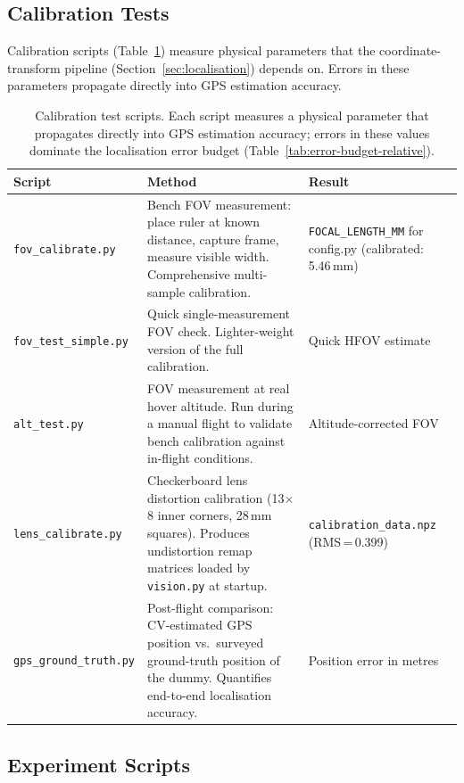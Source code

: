 \subsection{Calibration Tests}\label{sec:cal-tests}

Calibration scripts (Table~\ref{tab:cal-tests}) measure physical parameters that the coordinate-transform pipeline (Section~\ref{sec:localisation}) depends on.  Errors in these parameters propagate directly into GPS estimation accuracy.

\begin{table}[H]
\centering
\caption{Calibration test scripts.  Each script measures a physical parameter that propagates directly into GPS estimation accuracy; errors in these values dominate the localisation error budget (Table~\ref{tab:error-budget-relative}).}
\label{tab:cal-tests}
\small
\begin{tabular}{@{}lp{5.8cm}p{4.2cm}@{}}
\toprule
\textbf{Script} & \textbf{Method} & \textbf{Result} \\
\midrule
\texttt{fov\_calibrate.py} & Bench FOV measurement: place ruler at known distance, capture frame, measure visible width.  Comprehensive multi-sample calibration. & \texttt{FOCAL\_LENGTH\_MM} for config.py (calibrated: 5.46\,mm) \\
\addlinespace
\texttt{fov\_test\_simple.py} & Quick single-measurement FOV check.  Lighter-weight version of the full calibration. & Quick HFOV estimate \\
\addlinespace
\texttt{alt\_test.py} & FOV measurement at real hover altitude.  Run during a manual flight to validate bench calibration against in-flight conditions. & Altitude-corrected FOV \\
\addlinespace
\texttt{lens\_calibrate.py} & Checkerboard lens distortion calibration (13$\times$8 inner corners, 28\,mm squares).  Produces undistortion remap matrices loaded by \texttt{vision.py} at startup. & \texttt{calibration\_data.npz} (RMS\,=\,0.399) \\
\addlinespace
\texttt{gps\_ground\_truth.py} & Post-flight comparison: CV-estimated GPS position vs.\ surveyed ground-truth position of the dummy.  Quantifies end-to-end localisation accuracy. & Position error in metres \\
\bottomrule
\end{tabular}
\end{table}

\subsection{Experiment Scripts}\label{sec:experiment-scripts-app}

